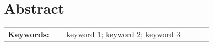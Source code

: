 \section*{Abstract}


\lipsum[2]


\vfill

\begin{tabular}{p{0.24\linewidth} p{0.6\linewidth}}
	\textbf{\Large Keywords:} & keyword 1; keyword  2; keyword 3 
\end{tabular}  \\